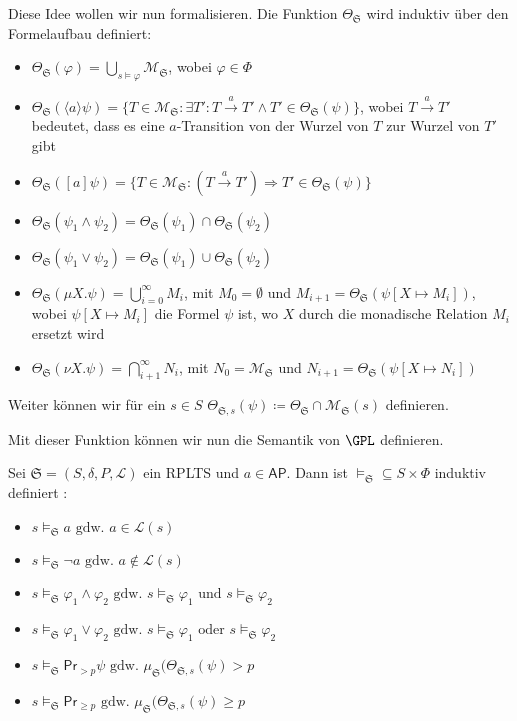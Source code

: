 Diese Idee wollen wir nun formalisieren. Die Funktion $\Theta_\mathfrak{S}$ wird induktiv über den Formelaufbau definiert:
\begin{itemize}
	\item $\Theta_\mathfrak{S}(\varphi) = \bigcup_{s\models \varphi}\mathcal{M}_\mathfrak{S}$, wobei $\varphi\in \Phi$
	\item $\Theta_\mathfrak{S}(\langle a\rangle \psi) = \{T\in \mathcal{M}_\mathfrak{S} : \exists T' : T\xrightarrow{a}T' \land T'\in \Theta_\mathfrak{S}(\psi)\}$, wobei $T\xrightarrow{a}T'$ bedeutet, dass es eine $a$-Transition von der Wurzel von $T$ zur Wurzel von $T'$ gibt
	\item $\Theta_\mathfrak{S}([a]\psi) = \{T\in \mathcal{M}_\mathfrak{S} : (T\xrightarrow{a}T') \Rightarrow T'\in \Theta_\mathfrak{S}(\psi)\}$
	\item $\Theta_\mathfrak{S}(\psi_1\land \psi_2) = \Theta_\mathfrak{S}(\psi_1)\cap \Theta_\mathfrak{S}(\psi_2)$
	\item $\Theta_\mathfrak{S}(\psi_1\lor\psi_2) = \Theta_\mathfrak{S}(\psi_1) \cup \Theta_\mathfrak{S}(\psi_2)$
	\item $\Theta_\mathfrak{S}(\mu X.\psi) = \bigcup_{i=0}^\infty M_i$, mit $M_0=\emptyset$ und $M_{i+1} = \Theta_\mathfrak{S}(\psi[X\mapsto M_i])$, wobei $\psi[X\mapsto M_i]$ die Formel $\psi$ ist, wo $X$ durch die monadische Relation $M_i$ ersetzt wird
	\item $\Theta_\mathfrak{S}(\nu X.\psi) = \bigcap_{i+1}^\infty N_i$, mit $N_0=\mathcal{M}_\mathfrak{S}$ und $N_{i+1}=\Theta_\mathfrak{S}(\psi[X\mapsto N_i])$
\end{itemize}
Weiter können wir für ein $s\in S$ $\Theta_{\mathfrak{S},s}(\psi)\coloneqq \Theta_\mathfrak{S}\cap \mathcal{M}_\mathfrak{S}(s)$ definieren. \cite{cleaveland2005probabilistic}

Mit dieser Funktion können wir nun die Semantik von $\GPL$ definieren.
\begin{definition}
	Sei $\mathfrak{S}=(S,\delta,P,\mathcal{L})$ ein RPLTS und $a\in \mathsf{AP}$. Dann ist $\models_\mathfrak{S}\subseteq S\times \Phi$ induktiv definiert \cite{cleaveland2005probabilistic}:
	\begin{itemize}
		\item $s\models_\mathfrak{S} a\text{ gdw. }a\in \mathcal{L}(s)$
		\item $s\models_\mathfrak{S} \neg a\text{ gdw. }a\notin \mathcal{L}(s)$
		\item $s\models_\mathfrak{S} \varphi_1\land\varphi_2\text{ gdw. }s\models_\mathfrak{S}\varphi_1\text{ und }s\models_\mathfrak{S}\varphi_2$
		\item $s\models_\mathfrak{S} \varphi_1\lor\varphi_2\text{ gdw. }s\models_\mathfrak{S}\varphi_1\text{ oder }s\models_\mathfrak{S}\varphi_2$
		\item $s\models_\mathfrak{S} \mathsf{Pr}_{>p}\psi\text{ gdw. }\mu_\mathfrak{S}(\Theta_{\mathfrak{S},s}(\psi)>p$
		\item $s\models_\mathfrak{S} \mathsf{Pr}_{\geq p}\text{ gdw. }\mu_\mathfrak{S}(\Theta_{\mathfrak{S},s}(\psi)\geq p$
	\end{itemize}
\end{definition}

